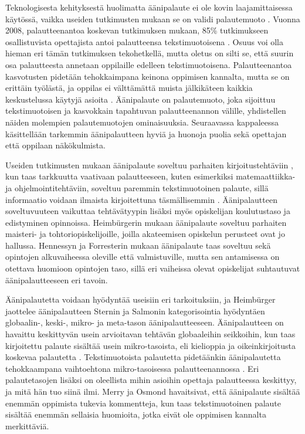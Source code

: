 \documentclass[utf8]{gradu3}
\begin{document}
Teknologisesta kehityksestä huolimatta äänipalaute ei ole kovin laajamittaisessa käytössä, vaikka useiden tutkimusten mukaan se on validi palautemuoto \parencite{engaging}. Vuonna 2008, palautteenantoa koskevan tutkimuksen mukaan, 85\% tutkimukseen osallistuvista opettajista antoi palautteensa tekstimuotoisena \parencite{electronic}. Osuus voi olla hieman eri tämän tutkimuksen tekohetkellä, mutta oletus on silti se, että suurin osa palautteesta annetaan oppilaille edelleen tekstimuotoisena. Palautteenantoa kasvotusten pidetään tehokkaimpana keinona oppimisen kannalta, mutta se on erittäin työlästä, ja oppilas ei välttämättä muista jälkikäteen kaikkia keskustelussa käytyjä asioita \parencite{modes}. Äänipalaute on palautemuoto, joka sijoittuu tekstimuotoisen ja kasvokkain tapahtuvan palautteenannon välille, yhdistellen näiden molempien palautemuotojen ominaisuuksia. Seuraavassa kappaleessa käsittellään tarkemmin äänipalautteen hyviä ja huonoja puolia sekä opettajan että oppilaan näkökulmista.

Useiden tutkimusten mukaan äänipalaute soveltuu parhaiten kirjoitustehtäviin \parencite{academics, engaging, using}, kun taas tarkkuutta vaativaan palautteeseen, kuten esimerkiksi matemaattiikka- ja ohjelmointitehtäviin, soveltuu paremmin tekstimuotoinen palaute, sillä informaatio voidaan ilmaista kirjoitettuna täsmällisemmin \parencite{academics}. Äänipalautteen soveltuvuuteen vaikuttaa tehtävätyypin lisäksi myös opiskelijan koulutustaso ja edistyminen opinnoissa. Heimbürgerin \parencite*{using} mukaan äänipalaute soveltuu parhaiten maisteri- ja tohtoriopiskelijoille, joilla akateemisen opiskelun perusteet ovat jo hallussa. Hennessyn ja Forresterin \parencite*{developing} mukaan äänipalaute taas soveltuu sekä opintojen alkuvaiheessa oleville että valmistuville, mutta sen antamisessa on otettava huomioon opintojen taso, sillä eri vaiheissa olevat opiskelijat suhtautuvat äänipalautteeseen eri tavoin.

Äänipalautetta voidaan hyödyntää useisiin eri tarkoituksiin, ja Heimbürger \parencite*{using} jaottelee äänipalautteen Sternin ja Salmonin \parencite*{stern} kategorisointia hyödyntäen globaalin-, keski-, mikro- ja meta-tason äänipalautteeseen. Äänipalautteen on havaittu keskittyvän usein arvioitavan tehtävän globaaleihin seikkoihin, kun taas kirjoitettu palaute sisältää usein mikro-tasoista, eli kielioppia ja oikeinkirjoitusta koskevaa palautetta \parencite{versus}. Tekstimuotoista palautetta pidetäänkin äänipalautetta tehokkaampana vaihtoehtona mikro-tasoisessa palautteenannossa \parencite{ice}. Eri palautetasojen lisäksi on oleellista mihin asioihin opettaja palautteessa keskittyy, ja mitä hän tuo siinä ilmi. Merry ja Osmond \parencite*{attitudes} havaitsivat, että äänipalaute sisältää enemmän oppimista tukevia kommentteja, kun taas tekstimuotoinen palaute sisältää enemmän sellaisia huomioita, jotka eivät ole oppimisen kannalta merkittäviä.
\end{document}
